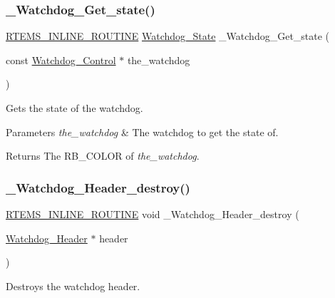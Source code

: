 \subsubsection{\texorpdfstring{\_Watchdog\_Get\_state()}{\_Watchdog\_Get\_state()}}
{\footnotesize\ttfamily \mbox{\hyperlink{group__RTEMSScoreBaseDefs_gac216239df231d5dbd15e3520b0b9313f}{R\+T\+E\+M\+S\+\_\+\+I\+N\+L\+I\+N\+E\+\_\+\+R\+O\+U\+T\+I\+NE}} \mbox{\hyperlink{group__RTEMSScoreWatchdog_ga05e885fccc21abb152cc73f29640c679}{Watchdog\+\_\+\+State}} \+\_\+\+Watchdog\+\_\+\+Get\+\_\+state (\begin{DoxyParamCaption}\item[{const \mbox{\hyperlink{structWatchdog__Control}{Watchdog\+\_\+\+Control}} $\ast$}]{the\+\_\+watchdog }\end{DoxyParamCaption})}



Gets the state of the watchdog. 


\begin{DoxyParams}{Parameters}
{\em the\+\_\+watchdog} & The watchdog to get the state of.\\
\hline
\end{DoxyParams}
\begin{DoxyReturn}{Returns}
The R\+B\+\_\+\+C\+O\+L\+OR of {\itshape the\+\_\+watchdog}. 
\end{DoxyReturn}
\mbox{\label{group__RTEMSScoreWatchdog_ga7227eda50b7bf164aa31cfcd9a9d8cca}} 
\subsubsection{\texorpdfstring{\_Watchdog\_Header\_destroy()}{\_Watchdog\_Header\_destroy()}}
{\footnotesize\ttfamily \mbox{\hyperlink{group__RTEMSScoreBaseDefs_gac216239df231d5dbd15e3520b0b9313f}{R\+T\+E\+M\+S\+\_\+\+I\+N\+L\+I\+N\+E\+\_\+\+R\+O\+U\+T\+I\+NE}} void \+\_\+\+Watchdog\+\_\+\+Header\+\_\+destroy (\begin{DoxyParamCaption}\item[{\mbox{\hyperlink{structWatchdog__Header}{Watchdog\+\_\+\+Header}} $\ast$}]{header }\end{DoxyParamCaption})}



Destroys the watchdog header. 


